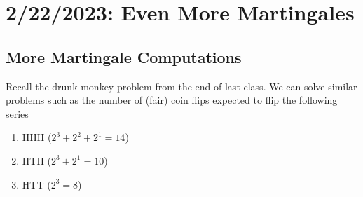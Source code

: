 \chapter{2/22/2023: Even More Martingales}
\section{More Martingale Computations}
Recall the drunk monkey problem from the end of last class. We can solve similar problems such as the number of (fair) coin flips expected to flip the following series \begin{enumerate}
	\item HHH ($2^3+2^2+2^1=14$)
	\item HTH ($2^3+2^1=10$)
	\item HTT ($2^3=8$)
\end{enumerate}

